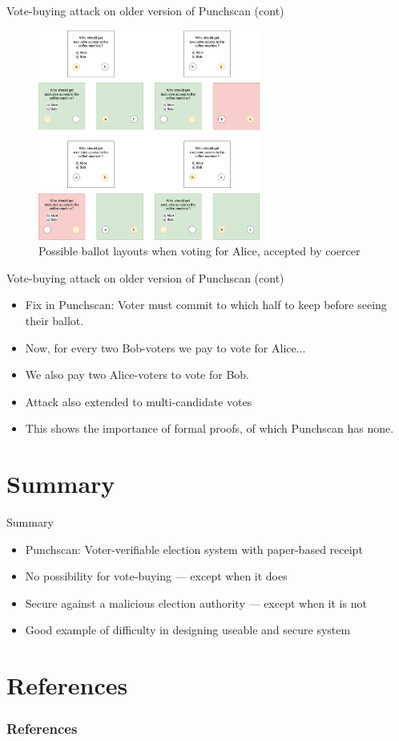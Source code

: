 \documentclass{beamer}
\begin{document}
\begin{frame}{Vote-buying attack on older version of Punchscan (cont)}
	\begin{figure}
		\centering
		\includegraphics[width=0.65\textwidth]{../resources/vote_buying_split_highlighted_alice.drawio.png}
		\caption{Possible ballot layouts when voting for Alice, accepted by coercer}
	\end{figure}
\end{frame}

\begin{frame}{Vote-buying attack on older version of Punchscan (cont)}
	\begin{itemize}
		\item Fix in Punchscan: Voter must commit to which half to keep before seeing their ballot.
		\item Now, for every two Bob-voters we pay to vote for Alice...
		\item We also pay two Alice-voters to vote for Bob.
		\item Attack also extended to multi-candidate votes\autocite{kelseyAttackingPaperBasedE2E2010}
		\item This shows the importance of formal proofs, of which Punchscan has none.
	\end{itemize}
\end{frame}

\section{Summary}

\begin{frame}{Summary}
	\begin{itemize}
		\item Punchscan: Voter-verifiable election system with paper-based receipt
		\item No possibility for vote-buying --- except when it does
		\item Secure against a malicious election authority --- except when it is not
		\item Good example of difficulty in designing useable and
			secure system
	\end{itemize}
\end{frame}

\section{References}

\begin{frame}[allowframebreaks]
	\frametitle{References}
	\printbibliography
\end{frame}
\end{document}

